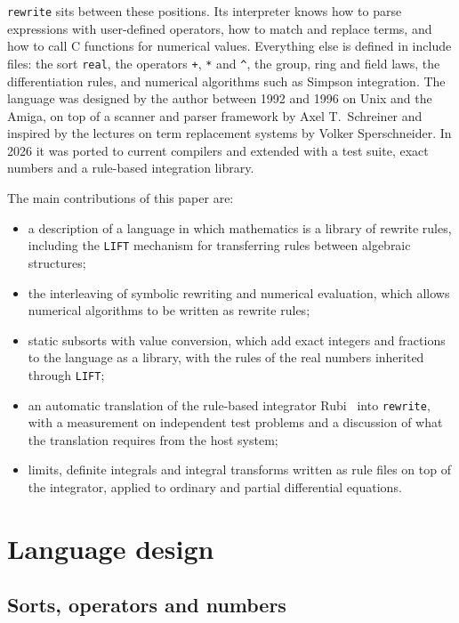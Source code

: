 \documentclass[11pt,a4paper]{article}
\begin{document}
\texttt{rewrite} sits between these positions. Its interpreter knows how to
parse expressions with user-defined operators, how to match and replace
terms, and how to call C functions for numerical values. Everything else is
defined in include files: the sort \texttt{real}, the operators \texttt{+},
\texttt{*} and \texttt{\^}, the group, ring and field laws, the
differentiation rules, and numerical algorithms such as Simpson integration.
The language was designed by the author between 1992 and 1996 on Unix and
the Amiga, on top of a scanner and parser framework by Axel T.\ Schreiner
and inspired by the lectures on term replacement systems by Volker Sperschneider.
In 2026 it was ported to current compilers and extended with a test suite,
exact numbers and a rule-based integration library.

The main contributions of this paper are:
\begin{itemize}
  \item a description of a language in which mathematics is a library of
        rewrite rules, including the \texttt{LIFT} mechanism for transferring
        rules between algebraic structures;
  \item the interleaving of symbolic rewriting and numerical evaluation,
        which allows numerical algorithms to be written as rewrite rules;
  \item static subsorts with value conversion, which add exact integers and
        fractions to the language as a library, with the rules of the real
        numbers inherited through \texttt{LIFT};
  \item an automatic translation of the rule-based integrator
        Rubi~\cite{rich2018rubi} into \texttt{rewrite}, with a measurement on
        independent test problems and a discussion of what the translation
        requires from the host system;
  \item limits, definite integrals and integral transforms written as rule
        files on top of the integrator, applied to ordinary and partial
        differential equations.
\end{itemize}

\section{Language design}

\subsection{Sorts, operators and numbers}
\end{document}
